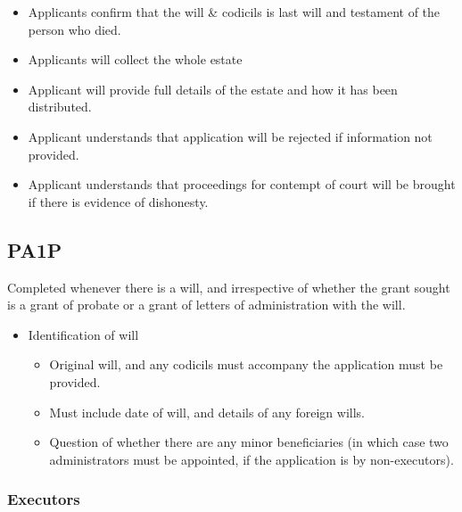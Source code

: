 \documentclass[
]{article}
\providecommand{\tightlist}{%
  \setlength{\itemsep}{0pt}\setlength{\parskip}{0pt}}
\begin{document}
\begin{itemize}
  \begin{itemize}
  \tightlist
  \item
    Applicants confirm that the will \& codicils is last will and
    testament of the person who died.
  \item
    Applicants will collect the whole estate
  \item
    Applicant will provide full details of the estate and how it has
    been distributed.
  \item
    Applicant understands that application will be rejected if
    information not provided.
  \item
    Applicant understands that proceedings for contempt of court will be
    brought if there is evidence of dishonesty.
  \end{itemize}
\end{itemize}

\hypertarget{pa1p}{%
\subsection{PA1P}\label{pa1p}}

Completed whenever there is a will, and irrespective of whether the
grant sought is a grant of probate or a grant of letters of
administration with the will.

\begin{itemize}
\tightlist
\item
  Identification of will

  \begin{itemize}
  \tightlist
  \item
    Original will, and any codicils must accompany the application must
    be provided.
  \item
    Must include date of will, and details of any foreign wills.
  \item
    Question of whether there are any minor beneficiaries (in which case
    two administrators must be appointed, if the application is by
    non-executors).
  \end{itemize}
\end{itemize}

\hypertarget{executors}{%
\subsubsection{Executors}\label{executors}}
\end{document}
